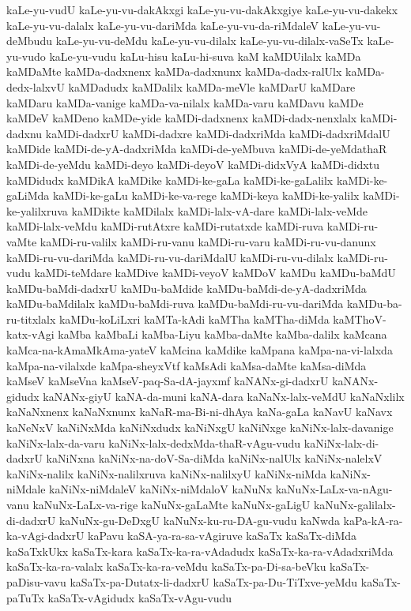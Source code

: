 {kaLe-yu-vudU
kaLe-yu-vu-dakAkxgi
kaLe-yu-vu-dakAkxgiye
kaLe-yu-vu-dakekx
kaLe-yu-vu-dalalx
kaLe-yu-vu-dariMda
kaLe-yu-vu-da-riMdaleV
kaLe-yu-vu-deMbudu
kaLe-yu-vu-deMdu
kaLe-yu-vu-dilalx
kaLe-yu-vu-dilalx-vaSeTx
kaLe-yu-vudo
kaLe-yu-vudu
kaLu-hisu
kaLu-hi-suva
kaM
kaMDUilalx
kaMDa
kaMDaMte
kaMDa-dadxnenx
kaMDa-dadxnunx
kaMDa-dadx-ralUlx
kaMDa-dedx-lalxvU
kaMDadudx
kaMDalilx
kaMDa-meVle
kaMDarU
kaMDare
kaMDaru
kaMDa-vanige
kaMDa-va-nilalx
kaMDa-varu
kaMDavu
kaMDe
kaMDeV
kaMDeno
kaMDe-yide
kaMDi-dadxnenx
kaMDi-dadx-nenxlalx
kaMDi-dadxnu
kaMDi-dadxrU
kaMDi-dadxre
kaMDi-dadxriMda
kaMDi-dadxriMdalU
kaMDide
kaMDi-de-yA-dadxriMda
kaMDi-de-yeMbuva
kaMDi-de-yeMdathaR
kaMDi-de-yeMdu
kaMDi-deyo
kaMDi-deyoV
kaMDi-didxVyA
kaMDi-didxtu
kaMDidudx
kaMDikA
kaMDike
kaMDi-ke-gaLa
kaMDi-ke-gaLalilx
kaMDi-ke-gaLiMda
kaMDi-ke-gaLu
kaMDi-ke-va-rege
kaMDi-keya
kaMDi-ke-yalilx
kaMDi-ke-yalilxruva
kaMDikte
kaMDilalx
kaMDi-lalx-vA-dare
kaMDi-lalx-veMde
kaMDi-lalx-veMdu
kaMDi-rutAtxre
kaMDi-rutatxde
kaMDi-ruva
kaMDi-ru-vaMte
kaMDi-ru-valilx
kaMDi-ru-vanu
kaMDi-ru-varu
kaMDi-ru-vu-danunx
kaMDi-ru-vu-dariMda
kaMDi-ru-vu-dariMdalU
kaMDi-ru-vu-dilalx
kaMDi-ru-vudu
kaMDi-teMdare
kaMDive
kaMDi-veyoV
kaMDoV
kaMDu
kaMDu-baMdU
kaMDu-baMdi-dadxrU
kaMDu-baMdide
kaMDu-baMdi-de-yA-dadxriMda
kaMDu-baMdilalx
kaMDu-baMdi-ruva
kaMDu-baMdi-ru-vu-dariMda
kaMDu-ba-ru-titxlalx
kaMDu-koLiLxri
kaMTa-kAdi
kaMTha
kaMTha-diMda
kaMThoV-katx-vAgi
kaMba
kaMbaLi
kaMba-Liyu
kaMba-daMte
kaMba-dalilx
kaMcana
kaMca-na-kAmaMkAma-yateV
kaMcina
kaMdike
kaMpana
kaMpa-na-vi-lalxda
kaMpa-na-vilalxde
kaMpa-sheyxVtf
kaMsAdi
kaMsa-daMte
kaMsa-diMda
kaMseV
kaMseVna
kaMseV-paq-Sa-dA-jayxmf
kaNANx-gi-dadxrU
kaNANx-gidudx
kaNANx-giyU
kaNA-da-muni
kaNA-dara
kaNaNx-lalx-veMdU
kaNaNxlilx
kaNaNxnenx
kaNaNxnunx
kaNaR-ma-Bi-ni-dhAya
kaNa-gaLa
kaNavU
kaNavx
kaNeNxV
kaNiNxMda
kaNiNxdudx
kaNiNxgU
kaNiNxge
kaNiNx-lalx-davanige
kaNiNx-lalx-da-varu
kaNiNx-lalx-dedxMda-thaR-vAgu-vudu
kaNiNx-lalx-di-dadxrU
kaNiNxna
kaNiNx-na-doV-Sa-diMda
kaNiNx-nalUlx
kaNiNx-nalelxV
kaNiNx-nalilx
kaNiNx-nalilxruva
kaNiNx-nalilxyU
kaNiNx-niMda
kaNiNx-niMdale
kaNiNx-niMdaleV
kaNiNx-niMdaloV
kaNuNx
kaNuNx-LaLx-va-nAgu-vanu
kaNuNx-LaLx-va-rige
kaNuNx-gaLaMte
kaNuNx-gaLigU
kaNuNx-galilalx-di-dadxrU
kaNuNx-gu-DeDxgU
kaNuNx-ku-ru-DA-gu-vudu
kaNwda
kaPa-kA-ra-ka-vAgi-dadxrU
kaPavu
kaSA-ya-ra-sa-vAgiruve
kaSaTx
kaSaTx-diMda
kaSaTxkUkx
kaSaTx-kara
kaSaTx-ka-ra-vAdadudx
kaSaTx-ka-ra-vAdadxriMda
kaSaTx-ka-ra-valalx
kaSaTx-ka-ra-veMdu
kaSaTx-pa-Di-sa-beVku
kaSaTx-paDisu-vavu
kaSaTx-pa-Dutatx-li-dadxrU
kaSaTx-pa-Du-TiTxve-yeMdu
kaSaTx-paTuTx
kaSaTx-vAgidudx
kaSaTx-vAgu-vudu
}
